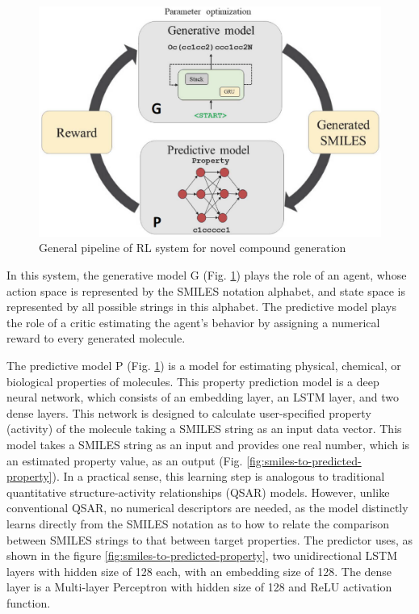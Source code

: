 \documentclass[a4paper]{article}
\begin{document}
\begin{figure}[htbp]
    \centering
        \includegraphics[width=\textwidth]{parameter-optimization.png}
    \caption{General pipeline of RL system for novel compound generation}
    \label{fig:parameter-optimization}
\end{figure}

In this system, the generative model G (Fig. \ref{fig:parameter-optimization}) plays the role of an agent, whose action space is represented by the SMILES notation alphabet, and state space is represented by all possible strings in this alphabet. The predictive model plays the role of a critic estimating the agent's behavior by assigning a numerical reward to every generated molecule. 


The predictive model P (Fig. \ref{fig:parameter-optimization}) is a model for estimating physical, chemical, or biological properties of molecules. This property prediction model is a deep neural network, which consists of an embedding layer, an LSTM layer, and two dense layers. This network is designed to calculate user-specified property (activity) of the molecule taking a SMILES string as an input data vector. This model takes a SMILES string as an input and provides one real number, which is an estimated property value, as an output (Fig. \ref{fig:smiles-to-predicted-property}). In a practical sense, this learning step is analogous to traditional  quantitative structure-activity relationships (QSAR) models. However, unlike conventional QSAR, no numerical descriptors are needed, as the model distinctly learns directly from the SMILES notation as to how to relate the comparison between SMILES strings to that between target properties. The predictor uses, as shown in the figure \ref{fig:smiles-to-predicted-property}, two unidirectional LSTM layers with hidden size of 128 each, with an embedding size of 128. The dense layer is a Multi-layer Perceptron with hidden size of 128 and ReLU activation function.
\end{document}
